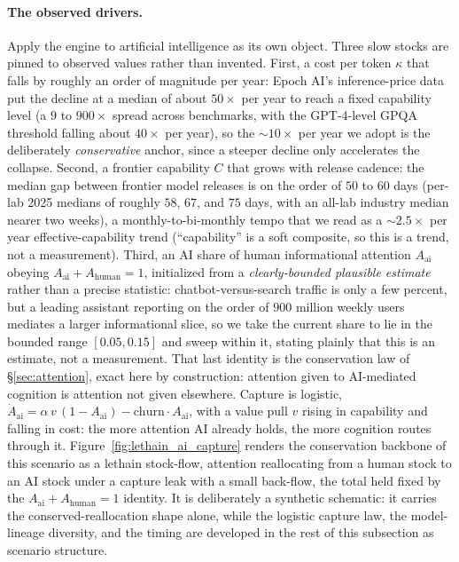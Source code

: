 \documentclass[11pt]{article}
\begin{document}
\paragraph{The observed drivers.} Apply the engine to artificial intelligence as its own object. Three slow stocks are pinned to observed values rather than invented. First, a cost per token $\kappa$ that falls by roughly an order of magnitude per year: Epoch AI's inference-price data put the decline at a median of about $50\times$ per year to reach a fixed capability level (a $9$ to $900\times$ spread across benchmarks, with the GPT-4-level GPQA threshold falling about $40\times$ per year), so the $\sim 10\times$ per year we adopt is the deliberately \emph{conservative} anchor, since a steeper decline only accelerates the collapse. Second, a frontier capability $C$ that grows with release cadence: the median gap between frontier model releases is on the order of $50$ to $60$ days (per-lab 2025 medians of roughly $58$, $67$, and $75$ days, with an all-lab industry median nearer two weeks), a monthly-to-bi-monthly tempo that we read as a $\sim 2.5\times$ per year effective-capability trend (``capability'' is a soft composite, so this is a trend, not a measurement). Third, an AI share of human informational attention $A_{\mathrm{ai}}$ obeying $A_{\mathrm{ai}} + A_{\mathrm{human}} = 1$, initialized from a \emph{clearly-bounded plausible estimate} rather than a precise statistic: chatbot-versus-search traffic is only a few percent, but a leading assistant reporting on the order of $900$ million weekly users mediates a larger informational slice, so we take the current share to lie in the bounded range $[0.05, 0.15]$ and sweep within it, stating plainly that this is an estimate, not a measurement. That last identity is the conservation law of \S\ref{sec:attention}, exact here by construction: attention given to AI-mediated cognition is attention not given elsewhere. Capture is logistic, $\dot A_{\mathrm{ai}} = \alpha\, v\,(1-A_{\mathrm{ai}}) - \mathrm{churn}\cdot A_{\mathrm{ai}}$, with a value pull $v$ rising in capability and falling in cost: the more attention AI already holds, the more cognition routes through it. Figure~\ref{fig:lethain_ai_capture} renders the conservation backbone of this scenario as a lethain stock-flow, attention reallocating from a human stock to an AI stock under a capture leak with a small back-flow, the total held fixed by the $A_{\mathrm{ai}}+A_{\mathrm{human}}=1$ identity. It is deliberately a synthetic schematic: it carries the conserved-reallocation shape alone, while the logistic capture law, the model-lineage diversity, and the timing are developed in the rest of this subsection as scenario structure.
\end{document}
